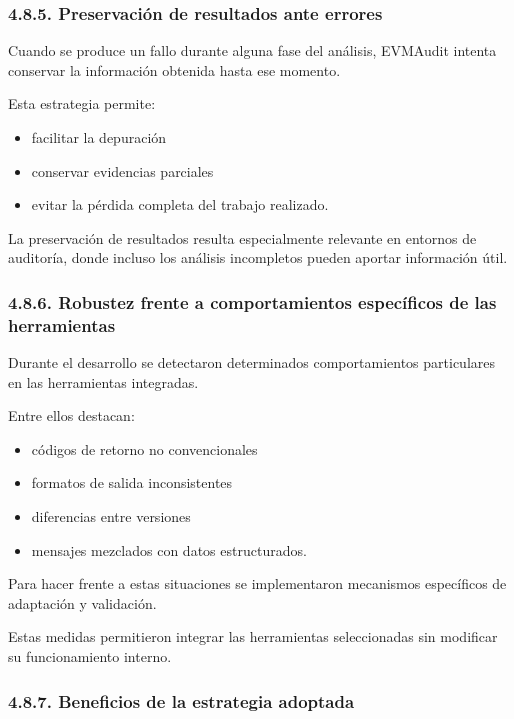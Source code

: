 \subsubsection{4.8.5. Preservación de resultados ante
errores}\label{preservaciuxf3n-de-resultados-ante-errores}

Cuando se produce un fallo durante alguna fase del análisis, EVMAudit
intenta conservar la información obtenida hasta ese momento.

Esta estrategia permite:

\begin{itemize}
\tightlist
\item
  facilitar la depuración
\item
  conservar evidencias parciales
\item
  evitar la pérdida completa del trabajo realizado.
\end{itemize}

La preservación de resultados resulta especialmente relevante en
entornos de auditoría, donde incluso los análisis incompletos pueden
aportar información útil.

\subsubsection{4.8.6. Robustez frente a comportamientos específicos de
las
herramientas}\label{robustez-frente-a-comportamientos-especuxedficos-de-las-herramientas}

Durante el desarrollo se detectaron determinados comportamientos
particulares en las herramientas integradas.

Entre ellos destacan:

\begin{itemize}
\tightlist
\item
  códigos de retorno no convencionales
\item
  formatos de salida inconsistentes
\item
  diferencias entre versiones
\item
  mensajes mezclados con datos estructurados.
\end{itemize}

Para hacer frente a estas situaciones se implementaron mecanismos
específicos de adaptación y validación.

Estas medidas permitieron integrar las herramientas seleccionadas sin
modificar su funcionamiento interno.

\subsubsection{4.8.7. Beneficios de la estrategia
adoptada}\label{beneficios-de-la-estrategia-adoptada}

